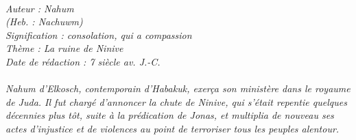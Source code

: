 \BFont
\noindent\hrulefill
{\footnotesize
\textit{
\bigskip
{\centering{}
\\Auteur : Nahum
\\(Heb. : Nachuwm)
\\Signification : consolation, qui a compassion
\\Thème : La ruine de Ninive
\\Date de rédaction : 7 siècle av. J.-C.\\}
}
\textit{
\\Nahum d'Elkosch, contemporain d'Habakuk, exerça son ministère dans le royaume de Juda. Il fut chargé d'annoncer la chute de Ninive, qui s'était repentie quelques décennies plus tôt, suite à la prédication de Jonas, et multiplia de nouveau ses actes d'injustice et de violences au point de terroriser tous les peuples alentour.\bigskip
}
}
\par\nobreak\noindent\hrulefill
